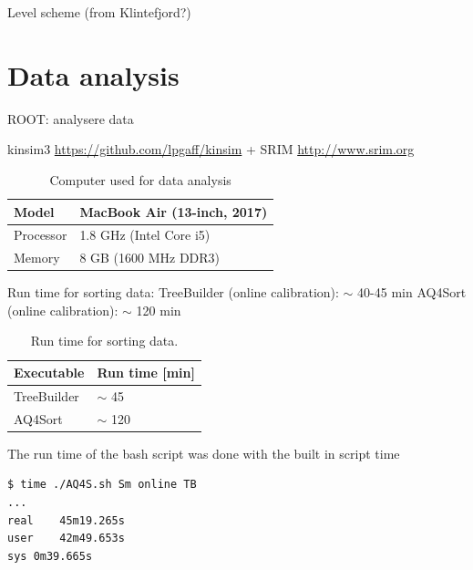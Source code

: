 \documentclass[twoside,english]{uiofysmaster/uiofysmaster}
\begin{document}
\bigskip

Level scheme (from Klintefjord?)




\chapter{Data analysis} 

ROOT: analysere data

kinsim3 \url{https://github.com/lpgaff/kinsim} + SRIM \url{http://www.srim.org}

\bigskip


\begin{table}[H] \centering 
\caption{Computer used for data analysis}
\label{tab:PC}
\begin{tabular}{ll}
\hline
Model & MacBook Air (13-inch, 2017) \\
\hline
Processor & 1.8 GHz (Intel Core i5) \\
Memory & 8 GB (1600 MHz DDR3) \\
\hline
\end{tabular}
\end{table}

Run time for sorting data: \newline
TreeBuilder (online calibration): $\sim$ 40-45 min \newline
AQ4Sort (online calibration): $\sim$ 120 min

\begin{table}[H] \centering 
\caption{Run time for sorting data.}
\label{tab:run_time}
\begin{tabular}{ll}
\hline
Executable & Run time [min] \\
\hline
TreeBuilder & $\sim$ 45 \\
AQ4Sort & $\sim$ 120 \\
\hline
\end{tabular}
\end{table}

The run time of the bash script was done with the built in script time

\begin{lstlisting}[language=sh]
$ time ./AQ4S.sh Sm online TB
...
real	45m19.265s
user	42m49.653s
sys	0m39.665s
\end{lstlisting}
\end{document}
